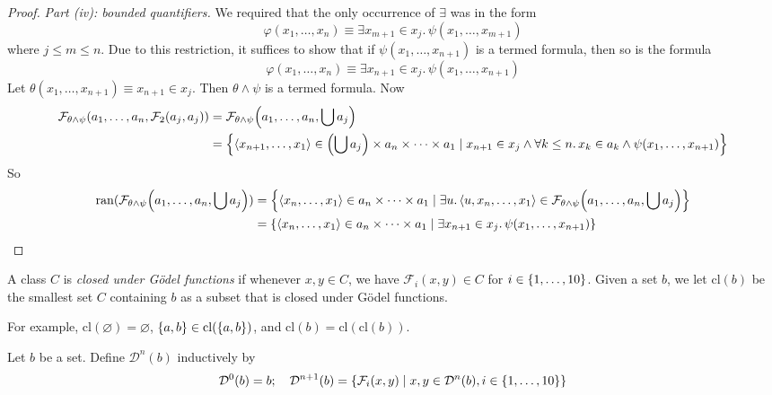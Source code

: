 \begin{proof}
    \emph{Part (iv): bounded quantifiers.}
    We required that the only occurrence of \( \exists \) was in the form
    \[ \varphi(x_1, \dots, x_n) \equiv \exists x_{m+1} \in x_j.\, \psi(x_1, \dots, x_{m+1}) \]
    where \( j \leq m \leq n \).
    Due to this restriction, it suffices to show that if \( \psi(x_1, \dots, x_{n+1}) \) is a termed formula, then so is the formula
    \[ \varphi(x_1, \dots, x_n) \equiv \exists x_{n+1} \in x_j.\, \psi(x_1, \dots, x_{n+1}) \]
    Let \( \theta(x_1, \dots, x_{n+1}) \equiv x_{n+1} \in x_j \).
    Then \( \theta \wedge \psi \) is a termed formula.
    Now
    \begin{align*}
        \mathcal F_{\theta \wedge \psi}(a_1, \dots, a_n, \mathcal F_2(a_j, a_j)) &= \mathcal F_{\theta \wedge \psi}\qty(a_1, \dots, a_n, \bigcup a_j) \\
        &= \qty{\langle x_{n+1}, \dots, x_1 \rangle \in \qty(\bigcup a_j) \times a_n \times \dots \times a_1 \mid x_{n+1} \in x_j \wedge \forall k \leq n.\, x_k \in a_k \wedge \psi(x_1, \dots, x_{n+1})}
    \end{align*}
    So
    \begin{align*}
        \operatorname{ran}(\mathcal F_{\theta \wedge \psi}\qty(a_1, \dots, a_n, \bigcup a_j)) &= \qty{\langle x_n, \dots, x_1 \rangle \in a_n \times \dots \times a_1 \mid \exists u.\, \langle u, x_n, \dots, x_1 \rangle \in \mathcal F_{\theta \wedge \psi}\qty(a_1, \dots, a_n, \bigcup a_j)} \\
        &= \qty{\langle x_n, \dots, x_1 \rangle \in a_n \times \dots \times a_1 \mid \exists x_{n+1} \in x_j.\, \psi(x_1, \dots, x_{n+1})}
    \end{align*}
\end{proof}
\begin{definition}
    A class \( C \) is \emph{closed under G\"odel functions} if whenever \( x, y \in C \), we have \( \mathcal F_i(x, y) \in C \) for \( i \in \qty{1, \dots, 10} \).
    Given a set \( b \), we let \( \mathrm{cl}(b) \) be the smallest set \( C \) containing \( b \) as a subset that is closed under G\"odel functions.
\end{definition}
For example, \( \mathrm{cl}(\varnothing) = \varnothing \), \( \qty{a, b} \in \mathrm{cl}(\qty{a, b}) \), and \( \mathrm{cl}(b) = \mathrm{cl}(\mathrm{cl}(b)) \).
\begin{definition}
    Let \( b \) be a set.
    Define \( \mathcal D^n(b) \) inductively by
    \[ \mathcal D^0(b) = b;\quad \mathcal D^{n+1}(b) = \qty{\mathcal F_i(x, y) \mid x, y \in \mathcal D^n(b), i \in \qty{1, \dots, 10}} \]
\end{definition}
